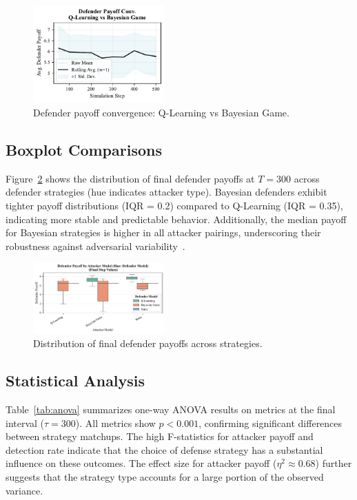 \documentclass[conference]{IEEEtran}
\begin{document}
\begin{figure}[htbp]
  \centering
  \includegraphics[width=0.45\textwidth]{fig_def_convergence.pdf}
  \caption{Defender payoff convergence: Q-Learning vs Bayesian Game.}
  \label{fig:conv_db}
\end{figure}

\subsection{Boxplot Comparisons}
Figure~\ref{fig:def_box} shows the distribution of final defender payoffs at $T=300$ across defender strategies (hue indicates attacker type). Bayesian defenders exhibit tighter payoff distributions (IQR = 0.2) compared to Q-Learning (IQR = 0.35), indicating more stable and predictable behavior. Additionally, the median payoff for Bayesian strategies is higher in all attacker pairings, underscoring their robustness against adversarial variability~\cite{zeng2023comparison}.

\begin{figure}[htbp]
  \centering
  \includegraphics[width=0.45\textwidth]{fig_def_payoff_boxplot.pdf}
  \caption{Distribution of final defender payoffs across strategies.}
  \label{fig:def_box}   
\end{figure}

\subsection{Statistical Analysis}
Table~\ref{tab:anova} summarizes one-way ANOVA results on metrics at the final interval ($\tau=300$). All metrics show $p<0.001$, confirming significant differences between strategy matchups. The high F-statistics for attacker payoff and detection rate indicate that the choice of defense strategy has a substantial influence on these outcomes. The effect size for attacker payoff ($\eta^2 \approx 0.68$) further suggests that the strategy type accounts for a large portion of the observed variance.
\end{document}
